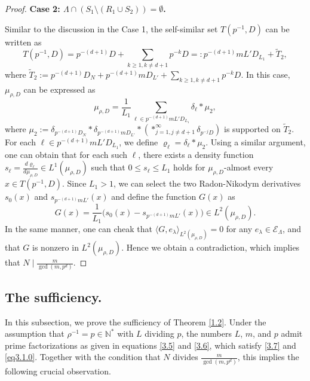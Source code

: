 \documentclass[11pt]{article}
\numberwithin{equation}{section}
\begin{document}
\begin{proof}
\medskip

\textbf{Case 2: $\Lambda\cap (S_1 \setminus (R_1\cup S_2))=\emptyset$.}

Similar to the discussion in the Case 1, the self-similar set $T(p^{-1},D)$ can be written as
$$T(p^{-1},D)=p^{-(d+1)}D+\sum_{k \ge 1,k \neq d+1}p^{-k}D=:p^{-(d+1)}mL'D_{L_1}+\tilde{T}_2,$$
where $\tilde{T}_2:=p^{-(d+1)}D_{N}+p^{-(d+1)}mD_{L'} +\sum_{k \ge 1,k \neq d+1}p^{-k}D $.
In this case,  $\mu_{\rho,D}$ can be expressed as 
$$\mu_{\rho,D}=\frac{1}{L_1} \sum_{\ell \in p^{-(d+1)}mL'D_{L_1}}\delta_{\ell} \ast \mu_2,$$
where $\mu_2:=\delta_{p^{-(d+1)}D_{N}} \ast \delta_{p^{-(d+1)}mD_{L'}} \ast (\ast^{\infty}_{j=1,j \neq d+1} \delta_{p^{-j}D})$ is supported on $\tilde{T}_2$.
 For each $\ell \in p^{-(d+1)}mL'D_{L_1}$, we define  $\varrho_{\ell} = \delta_{\ell} \ast \mu_2$. Using a similar argument, one can obtain that for each such $\ell$, there exists a density function $s_{\ell} = \frac{d\varrho_{\ell}}{d\mu_{\rho,D}} \in L^1(\mu_{\rho,D})$ such that $0 \le s_{\ell} \le L_1$ holds for $\mu_{\rho,D}$-almost every $x \in T(p^{-1},D)$. 
Since $L_1>1$, we can select the two Radon-Nikodym derivatives $s_{0}(x)$ and $s_{p^{-(d+1)}mL'}(x)$ and define the function $G(x)$ as
\begin{equation*}
	G(x) = \frac{1}{L_1} \Big( s_{0}(x) - s_{p^{-(d+1)}mL'}(x) \Big) \in L^2(\mu_{\rho,D}).
\end{equation*}
In the same manner, one can cheak that 
$\langle G,e_{\lambda} \rangle_{L^2(\mu_{\rho,D})}=0$ for any $e_{\lambda}\in \mathcal{E}_\Lambda$,
 and that $G$ is nonzero in $L^2(\mu_{\rho,D})$. 
 Hence we obtain a contradiction, which implies that $N\mid\frac{m}{\gcd(m,p^{d})}$.
\end{proof}



\subsection{The sufficiency.}

In this subsection, we prove the sufficiency of Theorem \ref{1.2}.
Under the assumption that $\rho^{-1}=p\in\mathbb{N}^*$ with $L$ dividing $p$, the numbers $L$, $m$, and $p$ admit prime factorizations as given in equations \eqref{3.5} and \eqref{3.6},  which satisfy  \eqref{3.7} and \eqref{eq3.1.0}. 
Together with the condition that $N$ divides $\frac{m}{\gcd(m,p^d)}$, this implies the following crucial observation.
\end{document}
